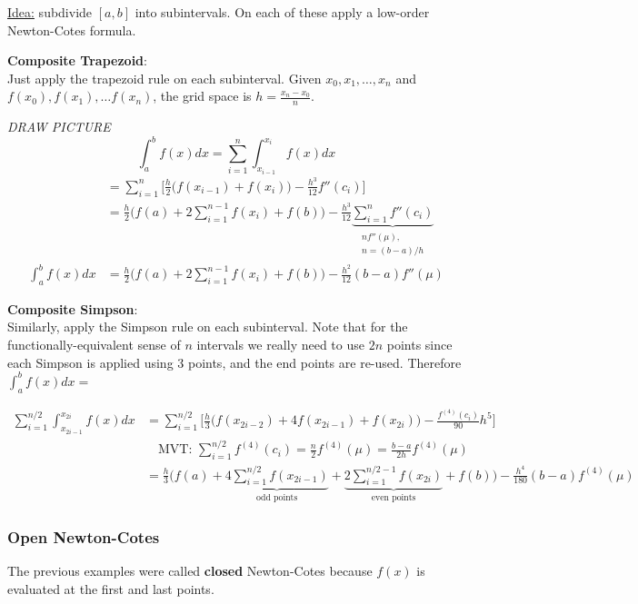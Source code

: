 \documentclass[12pt, answers]{exam}
\begin{document}
\underline{Idea:} subdivide $[a,b]$ into subintervals. On each of these apply a low-order Newton-Cotes formula.

\textbf{Composite Trapezoid}:\\
Just apply the trapezoid rule on each subinterval. Given $x_0, x_1, \dots, x_n$ and $f(x_0), f(x_1), \dots f(x_n)$, the grid space is $h = \frac{x_n-x_0}{n}$.

\textit{DRAW PICTURE}
\vspace*{-1em}
\[
\int_{a}^{b} f(x)dx = \sum_{i=1}^n \int_{x_{i-1}}^{x_i} f(x)dx\]
\ifprintanswers
\begin{align*}
&= \sum_{i=1}^n \bigl[ \frac{h}{2}\bigl(f(x_{i-1}) + f(x_i)\bigr) - \frac{h^3}{12}f''(c_i) \bigr] \\
&= \frac{h}{2}\bigl(f(a) + 2\sum_{i=1}^{n-1}f(x_i) + f(b)\bigr) - \frac{h^3}{12} \underbrace{\sum_{i=1}^n f''(c_i)}_{\substack{n f''(\mu),\\ n = (b-a)/h}}\\
\int_{a}^{b} f(x)dx &= \boxed{\frac{h}{2}\bigl(f(a) + 2\sum_{i=1}^{n-1}f(x_i) + f(b)\bigr) - \frac{h^2}{12}(b-a)f''(\mu) }
\end{align*}
\else
\vspace*{9em}
\fi
 
\textbf{Composite Simpson}:\\
Similarly, apply the Simpson rule on each subinterval. Note that for the functionally-equivalent sense of $n$ intervals we really need to use $2n$ points since each Simpson is applied using 3 points, and the end points are re-used. Therefore $\int_{a}^{b} f(x)dx = $

\begin{align*}
\sum_{i=1}^{n/2}\int_{x_{2i-1}}^{x_{2i}} f(x)dx &= \sum_{i=1}^{n/2} \bigl[ \frac{h}{3}\bigl(f(x_{2i-2}) + 4f(x_{2i-1}) + f(x_{2i})\bigr) - \frac{f^{(4)}(c_i)}{90}h^5 \bigr]\\
&\quad \text{MVT: } \sum_{i=1}^{n/2}f^{(4)}(c_i) = \frac{n}{2}f^{(4)}(\mu) = \frac{b-a}{2h}f^{(4)}(\mu)\\
&= \frac{h}{3}\bigl(f(a) + \underbrace{4\sum_{i=1}^{n/2} f(x_{2i-1})}_{\text{odd points}} + \underbrace{2\sum_{i=1}^{n/2-1} f(x_{2i})}_{\text{even points}} + f(b)\bigr) - \frac{h^4}{180}(b-a)f^{(4)}(\mu)
\end{align*}


\subsubsection*{Open Newton-Cotes}
The previous examples were called \textbf{closed} Newton-Cotes because $f(x)$ is evaluated at the first and last points.
\end{document}
